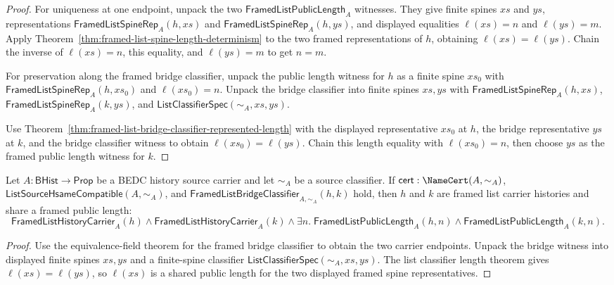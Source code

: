 \begin{proof}
For uniqueness at one endpoint, unpack the two
$\mathsf{FramedListPublicLength}_A$ witnesses. They give finite spines $xs$ and
$ys$, representations $\mathsf{FramedListSpineRep}_A(h,xs)$ and
$\mathsf{FramedListSpineRep}_A(h,ys)$, and displayed equalities
$\ell(xs)=n$ and $\ell(ys)=m$. Apply
Theorem~\ref{thm:framed-list-spine-length-determinism} to the two framed
representations of $h$, obtaining $\ell(xs)=\ell(ys)$. Chain the inverse of
$\ell(xs)=n$, this equality, and $\ell(ys)=m$ to get $n=m$.

For preservation along the framed bridge classifier, unpack the public length
witness for $h$ as a finite spine $xs_0$ with
$\mathsf{FramedListSpineRep}_A(h,xs_0)$ and $\ell(xs_0)=n$. Unpack the bridge
classifier into finite spines $xs,ys$ with
$\mathsf{FramedListSpineRep}_A(h,xs)$,
$\mathsf{FramedListSpineRep}_A(k,ys)$, and
$\mathsf{ListClassifierSpec}(\sim_A,xs,ys)$.

Use Theorem~\ref{thm:framed-list-bridge-classifier-represented-length} with the
displayed representative $xs_0$ at $h$, the bridge representative $ys$ at $k$,
and the bridge classifier witness to obtain $\ell(xs_0)=\ell(ys)$. Chain this
length equality with $\ell(xs_0)=n$, then choose $ys$ as the framed public length
witness for $k$.
\end{proof}

\begin{theorem}
\label{thm:list-framed-bridge-classifier-public-length-total}
Let $A:\mathsf{BHist}\to\mathsf{Prop}$ be a BEDC history source carrier and let
$\sim_A$ be a source classifier. If $\mathsf{cert}:\NameCert(A,\sim_A)$,
$\mathsf{ListSourceHsameCompatible}(A,\sim_A)$, and
$\mathsf{FramedListBridgeClassifier}_{A,\sim_A}(h,k)$ hold, then $h$ and $k$
are framed list carrier histories and share a framed public length:
$$
\mathsf{FramedListHistoryCarrier}_A(h)\land
\mathsf{FramedListHistoryCarrier}_A(k)
\land
\exists n.\;
\mathsf{FramedListPublicLength}_A(h,n)\land
\mathsf{FramedListPublicLength}_A(k,n).
$$
\end{theorem}
\begin{proof}
Use the equivalence-field theorem for the framed bridge classifier to obtain
the two carrier endpoints. Unpack the bridge witness into displayed finite
spines $xs,ys$ and a finite-spine classifier
$\mathsf{ListClassifierSpec}(\sim_A,xs,ys)$. The list classifier length theorem
gives $\ell(xs)=\ell(ys)$, so $\ell(xs)$ is a shared public length for the two
displayed framed spine representatives.
\end{proof}

